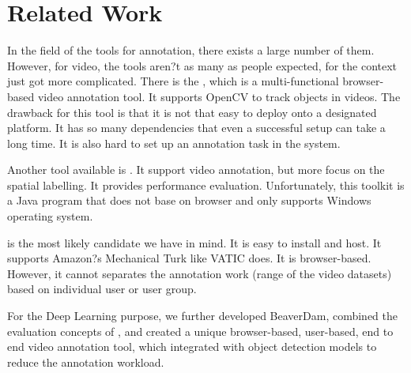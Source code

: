 \documentclass[conference]{IEEEtran}
\def\figref#1{Fig.~\ref{#1}}
\begin{document}








\section{Related Work}\label{sec.related}

In the field of the tools for annotation, there exists a large number of them. However, for video, the tools aren?t as many as people expected, for the context just got more complicated. There is the \cite{vondrick2011vatic}, which is a multi-functional browser-based video annotation tool. It supports OpenCV to track objects in videos. The drawback for this tool is that it is not that easy to deploy onto a designated platform. It has so many dependencies that even a successful setup can take a long time. It is also hard to set up an annotation task in the system.

Another tool available is \cite{doennann2000ViPER}. It support video annotation, but more focus on the spatial labelling. It provides performance evaluation. Unfortunately, this toolkit is a Java program that does not base on browser and only supports Windows operating system.

\cite{shen2016beaverdam} is the most likely candidate we have in mind. It is easy to install and host. It supports Amazon?s Mechanical Turk like VATIC does. It is browser-based. However, it cannot separates the annotation work (range of the video datasets) based on individual user or user group.

For the Deep Learning purpose, we further developed BeaverDam, combined the evaluation concepts of \cite{everingham2010vocchallenge}, and created a unique browser-based, user-based, end to end video annotation tool, which integrated with object detection models to reduce the annotation workload.
\end{document}
